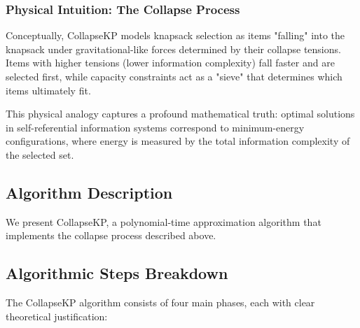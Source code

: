 \documentclass[11pt]{article}
\theoremstyle{remark}
\theoremstyle{definition}
\begin{document}
\subsubsection{Physical Intuition: The Collapse Process}

Conceptually, CollapseKP models knapsack selection as items "falling" into the knapsack under gravitational-like forces determined by their collapse tensions. Items with higher tensions (lower information complexity) fall faster and are selected first, while capacity constraints act as a "sieve" that determines which items ultimately fit.

This physical analogy captures a profound mathematical truth: optimal solutions in self-referential information systems correspond to minimum-energy configurations, where energy is measured by the total information complexity of the selected set.

\subsection{Algorithm Description}

We present CollapseKP, a polynomial-time approximation algorithm that implements the collapse process described above.

\subsection{Algorithmic Steps Breakdown}

The CollapseKP algorithm consists of four main phases, each with clear theoretical justification:
\end{document}
